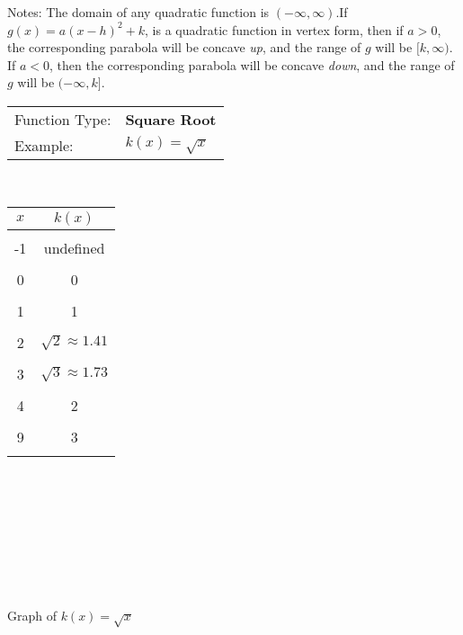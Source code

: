 \documentclass[11pt]{book}
\theoremstyle{definition}  %
\begin{document}
\noindent Notes: The domain of any quadratic function is $(-\infty,\infty)$.If\\ $g(x)=a(x-h)^2+k$, is a quadratic function in vertex form, then if $a>0$, the corresponding parabola will be concave \textit{up}, and the range of $g$ will be $[k,\infty)$.  If $a<0$, then the corresponding parabola will be concave \textit{down}, and the range of $g$ will be $(-\infty,k]$. 
\newpage

\begin{multicols}{2}
\begin{center}
\begin{tabular}{ll}
Function Type: &\textbf{Square Root}\\
Example: &$k(x)=\sqrt{x}$
\end{tabular}
\\
\vspace{0.25in}
\begin{tabular}{c|c}
	$x$ & $k(x)$\\
	\hline
 & \\
-1 & undefined\\
 & \\
0 & 0\\
 & \\
1 & 1\\
 & \\
2 & $\sqrt{2}\approx 1.41$\\
 & \\
3 & $\sqrt{3}\approx 1.73$\\
 & \\
4 & 2\\
 & \\
9 & 3\\
 & \\
\end{tabular}
\end{center}
~\\
~\\
~\\
~\\
~\\
~\\
~\\
\begin{center}
Graph of $k(x)=\sqrt{x}$
\end{center}
\end{multicols}
\end{document}
